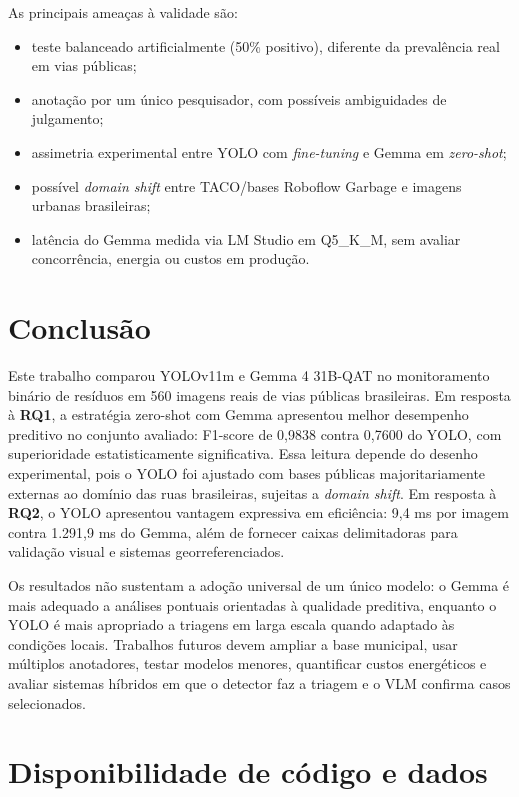 \documentclass[kdmile,a4paper]{kdmile}
\begin{document}
As principais ameaças à validade são:
\begin{itemize}
    \setlength{\itemsep}{0pt}
    \setlength{\parsep}{0pt}
    \setlength{\topsep}{2pt}
    \item teste balanceado artificialmente (50\% positivo), diferente da prevalência real em vias públicas;
    \item anotação por um único pesquisador, com possíveis ambiguidades de julgamento;
    \item assimetria experimental entre YOLO com \emph{fine-tuning} e Gemma em \emph{zero-shot};
    \item possível \emph{domain shift} entre TACO/bases Roboflow Garbage e imagens urbanas brasileiras;
    \item latência do Gemma medida via LM Studio em Q5\_K\_M, sem avaliar concorrência, energia ou custos em produção.
\end{itemize}

\section{Conclusão}
\label{sec:conclusao}

Este trabalho comparou YOLOv11m e Gemma 4 31B-QAT no monitoramento binário de resíduos em 560 imagens reais de vias públicas brasileiras. Em resposta à \textbf{RQ1}, a estratégia zero-shot com Gemma apresentou melhor desempenho preditivo no conjunto avaliado: F1-score de 0,9838 contra 0,7600 do YOLO, com superioridade estatisticamente significativa. Essa leitura depende do desenho experimental, pois o YOLO foi ajustado com bases públicas majoritariamente externas ao domínio das ruas brasileiras, sujeitas a \emph{domain shift}. Em resposta à \textbf{RQ2}, o YOLO apresentou vantagem expressiva em eficiência: 9,4 ms por imagem contra 1.291,9 ms do Gemma, além de fornecer caixas delimitadoras para validação visual e sistemas georreferenciados.

Os resultados não sustentam a adoção universal de um único modelo: o Gemma é mais adequado a análises pontuais orientadas à qualidade preditiva, enquanto o YOLO é mais apropriado a triagens em larga escala quando adaptado às condições locais. Trabalhos futuros devem ampliar a base municipal, usar múltiplos anotadores, testar modelos menores, quantificar custos energéticos e avaliar sistemas híbridos em que o detector faz a triagem e o VLM confirma casos selecionados.

\section*{Disponibilidade de código e dados}
\end{document}

